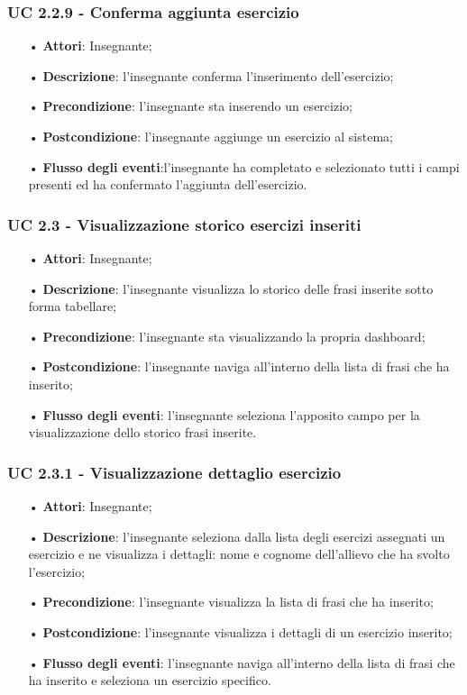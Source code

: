\subsubsection{UC 2.2.9 - Conferma aggiunta esercizio}
\begin{itemize}
	\item[•] \textbf{Attori}: Insegnante;
	\item[•] \textbf{Descrizione}: l'insegnante conferma l'inserimento dell'esercizio;
	\item[•] \textbf{Precondizione}: l'insegnante sta inserendo un esercizio;
	\item[•] \textbf{Postcondizione}: l'insegnante aggiunge un esercizio al sistema;
	\item[•] \textbf{Flusso degli eventi}:l'insegnante ha completato e selezionato tutti i campi presenti ed ha confermato l'aggiunta dell'esercizio.
\end{itemize}


\subsubsection{UC 2.3 - Visualizzazione storico esercizi inseriti}
\begin{itemize}
	\item[•] \textbf{Attori}: Insegnante;   
	\item[•] \textbf{Descrizione}: l'insegnante visualizza lo storico delle frasi inserite sotto forma tabellare; 
	\item[•] \textbf{Precondizione}: l'insegnante sta visualizzando la propria dashboard;
	\item[•] \textbf{Postcondizione}: l'insegnante naviga all'interno della lista di frasi che ha inserito;
	\item[•] \textbf{Flusso degli eventi}: l'insegnante seleziona l'apposito campo per la visualizzazione dello storico frasi inserite.
\end{itemize}


\subsubsection{UC 2.3.1 - Visualizzazione dettaglio esercizio}
\begin{itemize}
	\item[•] \textbf{Attori}: Insegnante;
	\item[•] \textbf{Descrizione}: l'insegnante seleziona dalla lista degli esercizi assegnati un esercizio e ne visualizza i dettagli: nome e cognome dell'allievo che ha svolto l'esercizio;
	\item[•] \textbf{Precondizione}: l'insegnante visualizza la lista di frasi che ha inserito;
	\item[•] \textbf{Postcondizione}: l'insegnante visualizza i dettagli di un esercizio inserito;
	\item[•] \textbf{Flusso degli eventi}: l'insegnante naviga all'interno della lista di frasi che ha inserito e seleziona un esercizio specifico.
\end{itemize}


